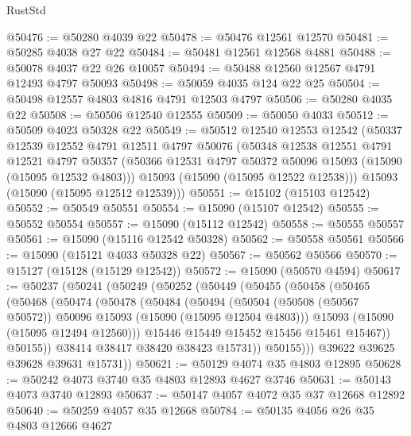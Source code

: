 \begin{lexlean}{RustStd}
\begin{coremodule}
@50476 := @50280 @4039 @22
@50478 := @50476 @12561 @12570
@50481 := @50285 @4038 @27 @22
@50484 := @50481 @12561 @12568 @4881
@50488 := @50078 @4037 @22 @26 @10057
@50494 := @50488 @12560 @12567 @4791 @12493 @4797 @50093
@50498 := @50059 @4035 @124 @22 @25
@50504 := @50498 @12557 @4803 @4816 @4791 @12503 @4797
@50506 := @50280 @4035 @22
@50508 := @50506 @12540 @12555
@50509 := @50050 @4033
@50512 := @50509 @4023 @50328 @22
@50549 := @50512
    @12540
    @12553
    @12542
    (@50337
      @12539
      @12552
      @4791
      @12511
      @4797
      @50076
      (@50348
        @12538
        @12551
        @4791
        @12521
        @4797
        @50357
        (@50366 @12531 @4797 @50372 @50096 @15093 (@15090 (@15095 @12532 @4803)))
        @15093
        (@15090 (@15095 @12522 @12538)))
      @15093
      (@15090 (@15095 @12512 @12539)))
@50551 := @15102 (@15103 @12542)
@50552 := @50549 @50551
@50554 := @15090 (@15107 @12542)
@50555 := @50552 @50554
@50557 := @15090 (@15112 @12542)
@50558 := @50555 @50557
@50561 := @15090 (@15116 @12542 @50328)
@50562 := @50558 @50561
@50566 := @15090 (@15121 @4033 @50328 @22)
@50567 := @50562 @50566
@50570 := @15127 (@15128 (@15129 @12542))
@50572 := @15090 (@50570 @4594)
@50617 := @50237
    (@50241
      (@50249
        (@50252
          (@50449
            (@50455
              (@50458
                (@50465
                  (@50468
                    (@50474
                      (@50478
                        (@50484
                          (@50494
                            (@50504
                              (@50508 (@50567 @50572))
                              @50096
                              @15093
                              (@15090 (@15095 @12504 @4803)))
                            @15093
                            (@15090 (@15095 @12494 @12560)))
                          @15446
                          @15449
                          @15452
                          @15456
                          @15461
                          @15467))
                      @50155))
                  @38414
                  @38417
                  @38420
                  @38423
                  @15731))
              @50155)))
        @39622
        @39625
        @39628
        @39631
        @15731))
@50621 := @50129 @4074 @35 @4803 @12895
@50628 := @50242 @4073 @3740 @35 @4803 @12893 @4627 @3746
@50631 := @50143 @4073 @3740 @12893
@50637 := @50147 @4057 @4072 @35 @37 @12668 @12892
@50640 := @50259 @4057 @35 @12668
@50784 := @50135
    @4056
    @26
    @35
    @4803
    @12666
    @4627

\end{coremodule}
\end{lexlean}
